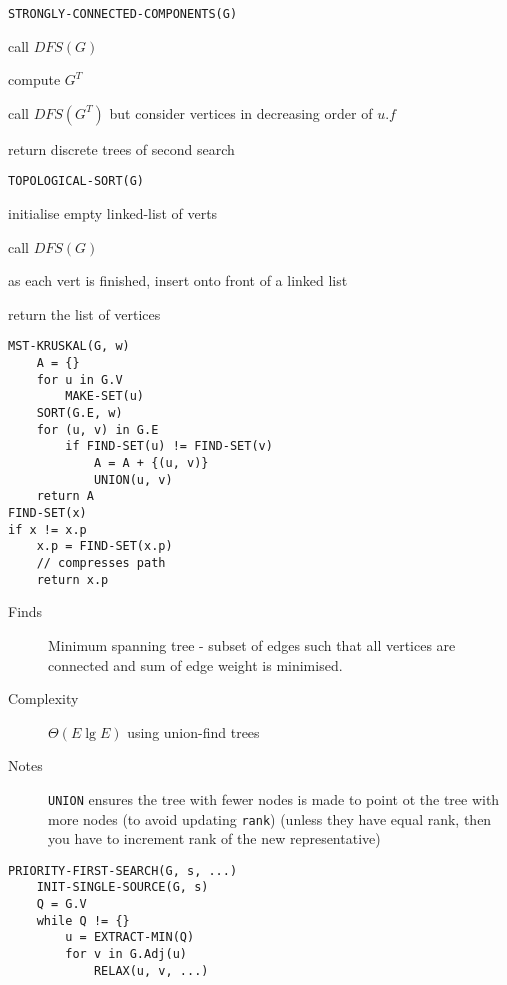\documentclass[10pt, a4paper,landscape]{article}
\begin{document}
\begin{multicols*}{4}
\begin{lstlisting}
STRONGLY-CONNECTED-COMPONENTS(G)
\end{lstlisting}
\begin{compactitem}
    \item call $DFS(G)$
    \item compute $G^T$
    \item call $DFS(G^T)$ but consider vertices in
        decreasing order of $u.f$
    \item return discrete trees of second search
\end{compactitem}

\begin{lstlisting}
TOPOLOGICAL-SORT(G)
\end{lstlisting}
\begin{compactitem}
    \item initialise empty linked-list of verts
    \item call $DFS(G)$
    \item as each vert is finished, insert onto front of a linked list
    \item return the list of vertices
\end{compactitem}

\begin{lstlisting}
MST-KRUSKAL(G, w)
    A = {}
    for u in G.V
        MAKE-SET(u)
    SORT(G.E, w)
    for (u, v) in G.E
        if FIND-SET(u) != FIND-SET(v)
            A = A + {(u, v)}
            UNION(u, v)
    return A
FIND-SET(x)
if x != x.p
    x.p = FIND-SET(x.p) 
    // compresses path
    return x.p
\end{lstlisting}
\begin{description}
    \item[Finds] Minimum spanning tree - subset of edges such that all vertices are connected and sum of edge weight is minimised.
    \item[Complexity] $\Theta(E\lg{E})$ using union-find trees
    \item[Notes] \texttt{UNION} ensures the tree with fewer nodes is made to point ot the tree with more nodes (to avoid updating \texttt{rank}) (unless they have equal rank, then you have to increment rank of the new representative)
\end{description}

\begin{lstlisting}
PRIORITY-FIRST-SEARCH(G, s, ...)
    INIT-SINGLE-SOURCE(G, s)
    Q = G.V
    while Q != {}
        u = EXTRACT-MIN(Q)
        for v in G.Adj(u)
            RELAX(u, v, ...)


\end{lstlisting}
\end{multicols*}
\end{document}
